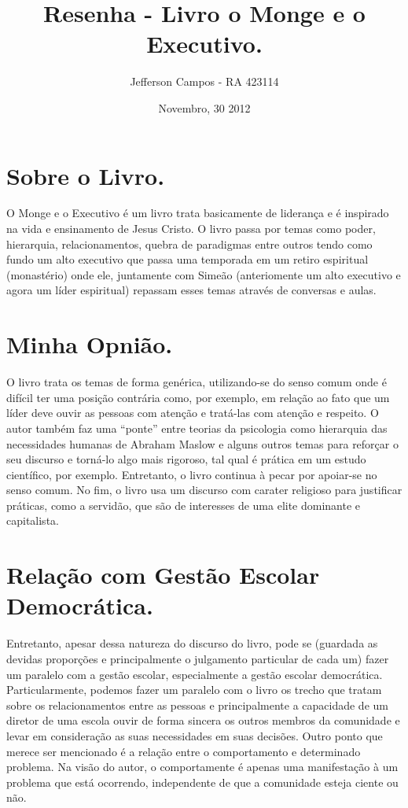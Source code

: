 \documentclass[a4paper,12pt]{article}
\title{Resenha - Livro o Monge e o Executivo.}
\author{Jefferson Campos - RA 423114}
\date{Novembro, 30 2012}
\begin{document}
\maketitle
\newpage

\section{Sobre o Livro.}

O Monge e o Executivo é um livro trata basicamente de liderança e é inspirado na vida e ensinamento de Jesus Cristo. O livro passa por temas como poder, hierarquia, relacionamentos, quebra de paradigmas entre outros tendo como fundo um alto executivo que passa uma temporada em um retiro espiritual (monastério) onde ele, juntamente com Simeão (anteriomente um alto executivo e agora um líder espiritual) repassam esses temas através de conversas e aulas.

\section{Minha Opnião.}

O livro trata os temas de forma genérica, utilizando-se do senso comum onde é difícil ter uma posição contrária como, por exemplo, em relação ao fato que um líder deve ouvir as pessoas com atenção e tratá-las com atenção e respeito. O autor também faz uma ``ponte'' entre teorias da psicologia como hierarquia das necessidades humanas de Abraham Maslow e alguns outros temas para reforçar o seu discurso e torná-lo algo mais rigoroso, tal qual é prática em um estudo científico, por exemplo. Entretanto, o livro continua à pecar por apoiar-se no senso comum. No fim, o livro usa um discurso com carater religioso para justificar práticas, como a servidão, que são de interesses de uma elite dominante e capitalista.

\section{Relação com Gestão Escolar Democrática.}

Entretanto, apesar dessa natureza do discurso do livro, pode se (guardada as devidas proporções e principalmente o julgamento particular de cada um) fazer um paralelo com a gestão escolar, especialmente a gestão escolar democrática. Particularmente, podemos fazer um paralelo com o livro os trecho que tratam sobre os relacionamentos entre as pessoas e principalmente a capacidade de um diretor de uma escola ouvir de forma sincera os outros membros da comunidade e levar em consideração as suas necessidades em suas decisões. Outro ponto que merece ser mencionado é a relação entre o comportamento e determinado problema. Na visão do autor, o comportamente é apenas uma manifestação à um problema que está ocorrendo, independente de que a comunidade esteja ciente ou não.
\end{document}
